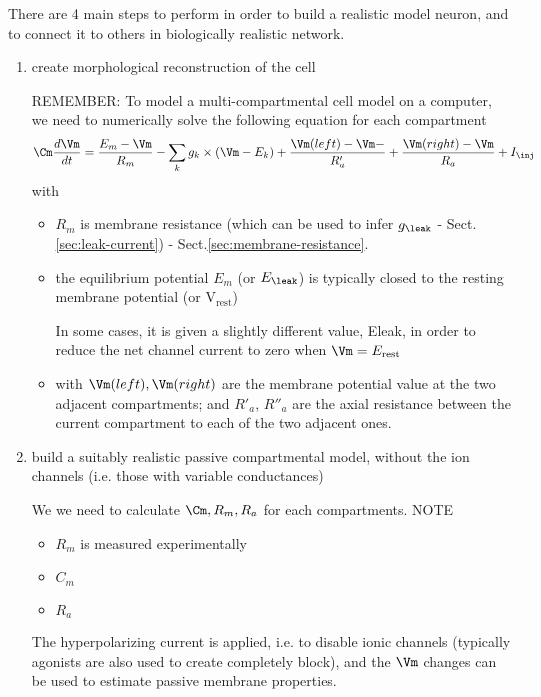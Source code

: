There are 4 main steps to perform in order to build a realistic model neuron,
and to connect it to others in biologically realistic network.
\begin{enumerate}
  \item create morphological reconstruction of the cell 
  
REMEMBER: To model a multi-compartmental cell model on a computer, we need to
numerically solve the following equation for each compartment
\begin{equation}
\Cm \frac{d\Vm}{dt} = \frac{E_m - \Vm}{R_m} - \sum_k g_k \times (\Vm - E_k) 
     +  \frac{\Vm(left) - \Vm - }{R'_a} + \frac{\Vm(right) - \Vm}{R_a} +
     I_\inj
\end{equation}  
with 
\begin{itemize}
  \item  $R_m$ is membrane resistance (which can be used to infer $g_\leak$ -
  Sect.\ref{sec:leak-current}) - Sect.\ref{sec:membrane-resistance}.
  
  \item the equilibrium potential $E_m$ (or $E_\leak$) is typically closed
  to the resting membrane potential (or V$_\text{rest}$)
  
  In some cases, it is given a slightly different value, Eleak, in order to
  reduce the net channel current to zero when $\Vm = E_\rest$

  \item with $\Vm(left), \Vm(right)$ are the membrane potential value at the two
  adjacent compartments; and $R'_a$, $R''_a$ are the axial resistance between
  the current compartment to each of the two adjacent ones.
\end{itemize}



  \item build a suitably realistic passive compartmental model, without the
  ion channels (i.e. those with variable conductances)
  
We we need to calculate $\Cm, R_m, R_a$ for each compartments. NOTE
\begin{itemize}
  \item $R_m$ is measured experimentally 
  
  \item $C_m$
  
  \item $R_a$
\end{itemize}  
  The hyperpolarizing current is applied, i.e. to disable ionic channels
  (typically agonists are also used to create completely block), and the $\Vm$
  changes can be used to estimate passive membrane properties.
  

\end{enumerate}
